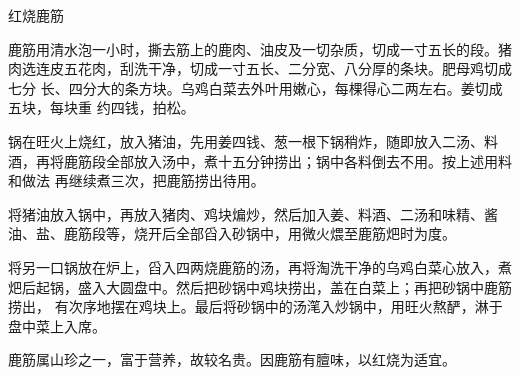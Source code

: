 %
%
%
%
%
%
%
\begin{recipe}{红烧鹿筋}

\ingredients


\preparation

\step 鹿筋用清水泡一小时，撕去筋上的鹿肉、油皮及一切杂质，切成一寸五长的段。猪
肉选连皮五花肉，刮洗干净，切成一寸五长、二分宽、八分厚的条块。肥母鸡切成七分
长、四分大的条方块。乌鸡白菜去外叶用嫩心，每棵得心二两左右。姜切成五块，每块重
约四钱，拍松。

\step 锅在旺火上烧红，放入猪油，先用姜四钱、葱一根下锅稍炸，随即放入二汤、料
酒，再将鹿筋段全部放入汤中，煮十五分钟捞出；锅中各料倒去不用。按上述用料和做法
再继续煮三次，把鹿筋捞出待用。

\step 将猪油放入锅中，再放入猪肉、鸡块煸炒，然后加入姜、料酒、二汤和味精、酱
油、盐、鹿筋段等，烧开后全部舀入砂锅中，用微火煨至鹿筋𤆵时为度。

\step 将另一口锅放在炉上，舀入四两烧鹿筋的汤，再将淘洗干净的乌鸡白菜心放入，煮
𤆵后起锅，盛入大圆盘中。然后把砂锅中鸡块捞出，盖在白菜上；再把砂锅中鹿筋捞出，
有次序地摆在鸡块上。最后将砂锅中的汤滗入炒锅中，用旺火熬酽，淋于盘中菜上入席。

\features

鹿筋属山珍之一，富于营养，故较名贵。因鹿筋有膻味，以红烧为适宜。

\end{recipe}

